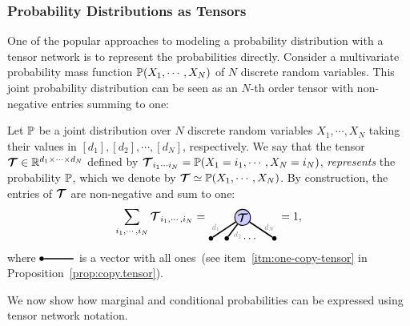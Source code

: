 \subsubsection{Probability Distributions as Tensors}\label{sub:probs}
 One of the popular approaches to modeling a probability distribution with a tensor network is to represent the probabilities directly. Consider a multivariate probability mass function $\mathbb{P}(X_1,\cdots,X_N)$ of $N$ discrete random variables. This joint probability distribution can be seen as an $N$-th order tensor with non-negative entries summing to one: 
\begin{definition}\label{def:probability}
Let $\mathbb{P}$ be a joint distribution over $N$ discrete random variables $X_1,\cdots,X_N$ taking their values in $[d_1], [d_2], \cdots,[d_N]$, respectively. 
We say that the tensor $\bm{\mathcal{T}}\in\mathbb{R}^{d_1\times\cdots\times d_N}$ defined by $\bm{\mathcal{T}}_{i_1\cdots i_N} = \mathbb{P}(X_1=i_1,\cdots,X_N=i_N)$, \emph{represents} the probability $\mathbb{P}$, which we denote by $\bm{\mathcal{T}} \simeq  \mathbb{P}(X_1,\cdots,X_N)$. By construction, the entries of $\bm{\mathcal{T}}$ are non-negative and sum to one: 
$$
\sum_{i_1,\cdots,i_N}\Tt_{i_1,\cdots,i_N} 
=
\begin{tikzpicture}[baseline=\baseline]
    \tikzset{tensor/.style = {minimum size = 0.5cm,shape = circle,thick,draw=black,inner sep = 0pt}, edge/.style = {thick,line width=.4mm},every loop/.style={}}
    \def\x{0}
    \def\y{0}
    \node[tensor,fill=blue!20!white] (T) at (\x+1,\y) {$\Tt$};
    \draw  node[fill = black,circle,inner sep=0pt,minimum size=4pt] (m_1) at (\x,\y-0.65) {};
    \draw  node[fill = black,circle,inner sep=0pt,minimum size=4pt] (m_2) at (\x+0.5,\y-0.65) {};
    \draw  node[fill = black,circle,inner sep=0pt,minimum size=4pt] (m_3) at (\x+2,\y-0.65) {};
    \node[draw=none] at (\x+1.25,\y-0.65){$\dots$};
    \draw[edge] (T) -- (m_1)node [very near end,above]
    {\scalebox{0.7}{\dimcolor{$d_1$}}};
    \draw[edge] (T) -- (m_2)node [very near end,right]
    {\scalebox{0.7}{\dimcolor{$d_2$}}};
    \draw[edge] (T) -- (m_3)node [very near end,above]
    {\scalebox{0.7}{\dimcolor{$d_N$}}};
\end{tikzpicture}
= 1,
$$
where $
\begin{tikzpicture}[baseline=\baseline]
    \tikzset{tensor/.style = {minimum size = 0.5cm,shape = circle,thick,draw=black,inner sep = 0pt}, edge/.style = {thick,line width=.4mm},every loop/.style={}}
    \def\x{0}
    \def\y{0}
    \draw  node[fill = black,circle,inner sep=0pt,minimum size=4pt] (m_1) at (\x,\y) {};
    \draw[edge](m_1)--(\x+1,\y);
    \end{tikzpicture}
$
is a vector with all ones~(see item~\ref{itm:one-copy-tensor} in Proposition~\ref{prop:copy.tensor}).
\end{definition}
We now show how marginal and conditional probabilities can be expressed using tensor network notation.
